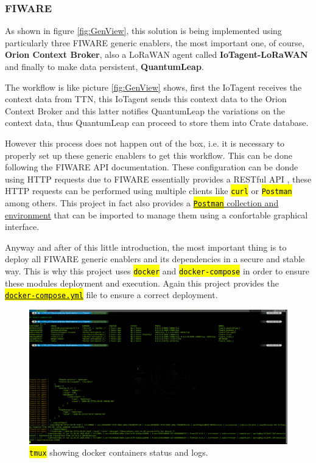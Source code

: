 \documentclass[11pt,a4paper,dvipsnames,twoside]{article}
\newcommand{\cmd}[1] {\hl{\texttt{#1}}}
\begin{document}
\subsubsection{FIWARE}\label{sssec:FIWARE}
As shown in figure \ref{fig:GenView}, this solution is being implemented using particularly three FIWARE generic enablers, the most important one, of course, \textbf{Orion Context Broker}, also a LoRaWAN agent called \textbf{IoTagent-LoRaWAN} and finally to make data persistent, \textbf{QuantumLeap}.

The workflow is like picture \ref{fig:GenView} shows, first the IoTagent receives the context data from TTN, this IoTagent sends this context data to the Orion Context Broker and this latter notifies QuantumLeap the variations on the context data, thus QuantumLeap can proceed to store them into Crate database.

However this process does not happen out of the box, i.e. it is necessary to properly set up these generic enablers to get this workflow. This can be done following the FIWARE API documentation. These configuration can be donde using HTTP requests due to FIWARE essentially provides a RESTful API \cite{FIWARE_RESTful}, these HTTP requests can be performed using multiple clients like \cmd{curl} or \cmd{Postman} among others. This project in fact also provides a \href{https://github.com/WyRe/lora-arduino-dendrometer/tree/master/src/postman}{\cmd{Postman} collection and environment} that can be imported to manage them using a confortable graphical interface.

Anyway and after of this little introduction, the most important thing is to deploy all FIWARE generic enablers and its dependencies in a secure and stable way. This is why this project uses \cmd{docker} and \cmd{docker-compose} in order to ensure these modules deployment and execution. Again this project provides the \href{https://github.com/WyRe/lora-arduino-dendrometer/blob/master/src/fiware/docker-compose.yml}{\cmd{docker-compose.yml}} file to ensure a correct deployment. 

\begin{figure}[ht]
  \centering
  \includegraphics[width=.9\textwidth]{../pictures/docker_containers_deployed.png}  
  \caption{\cmd{tmux} showing docker containers status and logs.}
  \label{fig:docker_containers}
\end{figure}
\end{document}
